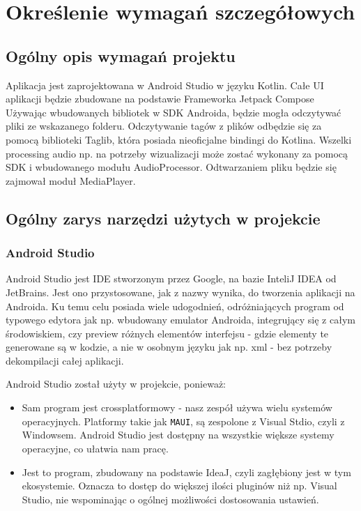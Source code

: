\newpage
\section{Określenie wymagań szczegółowych}		%

\subsection{Ogólny opis wymagań projektu}

Aplikacja jest zaprojektowana w Android Studio w języku Kotlin. Całe UI aplikacji będzie zbudowane na podstawie Frameworka Jetpack Compose\cite{doc_compose} Używając wbudowanych bibliotek w SDK Androida, będzie mogła odczytywać pliki ze wskazanego folderu. Odczytywanie tagów z plików odbędzie się za pomocą biblioteki Taglib\cite{doc_ktaglib}, która posiada nieoficjalne bindingi do Kotlina. Wszelki processing audio np. na potrzeby wizualizacji może zostać wykonany za pomocą SDK i wbudowanego modułu AudioProcessor\cite{doc_audioproc}. Odtwarzaniem pliku będzie się zajmował moduł MediaPlayer\cite{doc_mediaplayer}.

\subsection{Ogólny zarys narzędzi użytych w projekcie}

\subsubsection{Android Studio}

Android Studio jest IDE stworzonym przez Google, na bazie InteliJ IDEA od JetBrains. Jest ono przystosowane, jak z nazwy wynika, do tworzenia aplikacji na Androida. Ku temu celu posiada wiele udogodnień, odróżniających program od typowego edytora jak np. wbudowany emulator Androida, integrujący się z całym środowiskiem, czy preview różnych elementów interfejsu - gdzie elementy te generowane są w kodzie, a nie w osobnym języku jak np. xml - bez potrzeby dekompilacji całej aplikacji. 

Android Studio został użyty w projekcie, ponieważ:

\begin{itemize}
	\item Sam program jest crossplatformowy - nasz zespół używa wielu systemów operacyjnych. Platformy takie jak \texttt{MAUI}, są zespolone z Visual Stdio, czyli z Windowsem. Android Studio jest dostępny na wszystkie większe systemy operacyjne, co ułatwia nam pracę.
	\item Jest to program, zbudowany na podstawie IdeaJ, czyli zagłębiony jest w tym ekosystemie. Oznacza to dostęp do większej ilości pluginów niż np. Visual Studio, nie wspominając o ogólnej możliwości dostosowania ustawień.
\end{itemize}

